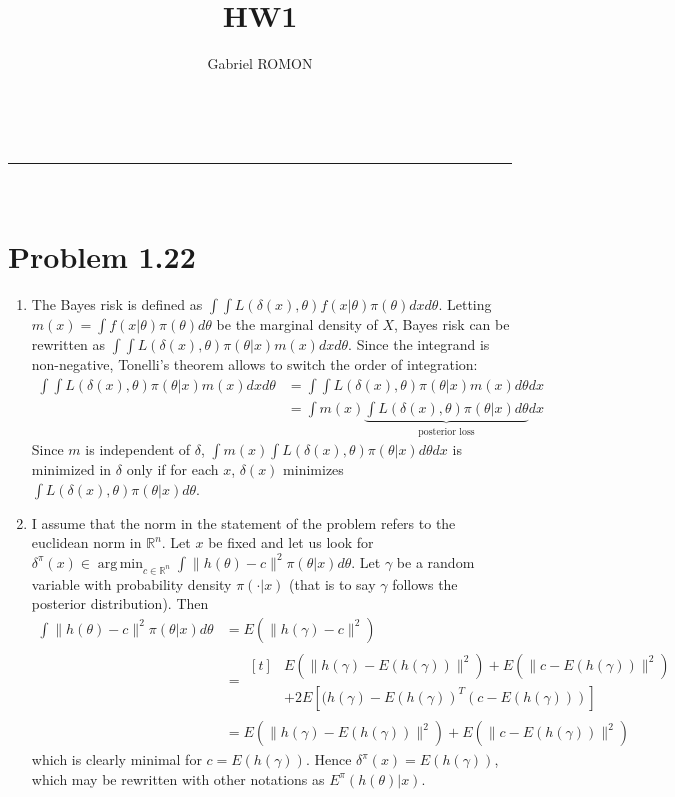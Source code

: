 \documentclass[a4paper,11pt]{article}
\makeatletter
\newcommand{\linia}{\rule{\linewidth}{0.5pt}}
\renewcommand{\maketitle}{
\begin{center}
\vspace{2ex}
{\huge \textsc{\@title}}
\vspace{1ex}
\\
\linia\\
\@author 
\vspace{4ex}
\end{center}
}
\DeclareMathOperator*{\argmin}{arg\,min}
\makeatother
\begin{document}
\title{HW1}

\author{Gabriel ROMON}



\maketitle

\section*{Problem 1.22}

\begin{enumerate}[label=(\alph*)]
  \item The Bayes risk is defined as $\displaystyle \int \int L(\delta(x),\theta)f(x|\theta)\pi(\theta)dx d\theta$. Letting $m(x)=\int f(x|\theta)\pi(\theta)d\theta$ be the marginal density of $X$, Bayes risk can be rewritten as $\displaystyle \int \int L(\delta(x),\theta)\pi(\theta|x)m(x)dx d\theta$. Since the integrand is non-negative, Tonelli's theorem allows to switch the order of integration:
  $$\begin{aligned}\int \int L(\delta(x),\theta)\pi(\theta|x)m(x)dx d\theta &= \int \int L(\delta(x),\theta)\pi(\theta|x)m(x)d\theta dx\\ 
  &= \int m(x) \underbrace{\int L(\delta(x),\theta)\pi(\theta|x) d\theta}_{\text{posterior loss}} dx \end{aligned}$$
  Since $m$ is independent of $\delta$, $\displaystyle\int m(x) \int L(\delta(x),\theta)\pi(\theta|x) d\theta dx$ is minimized in $\delta$ only if for each $x$, $\delta(x)$ minimizes $\displaystyle\int L(\delta(x),\theta)\pi(\theta|x) d\theta$.

  \item I assume that the norm in the statement of the problem refers to the euclidean norm in $\mathbb R^n$. Let $x$ be fixed and let us look for $\displaystyle \delta^{\pi}(x)\in \argmin_{c\in \mathbb R^n} \int \|h(\theta)-c\|^2\pi(\theta|x)d\theta$. Let $\gamma$ be a random variable with probability density $\pi(\cdot|x)$ (that is to say $\gamma$ follows the posterior distribution). Then 
  $$\begin{aligned}
    \int \|h(\theta)-c\|^2\pi(\theta|x)d\theta &= E(\|h(\gamma)-c\|^2)\\
    &= \begin{aligned}[t] &E(\|h(\gamma)-E(h(\gamma))\|^2) + E(\|c-E(h(\gamma))\|^2) \\ &+ 2E[(h(\gamma)-E(h(\gamma))^T(c-E(h(\gamma)))] \end{aligned}\\
    &= E(\|h(\gamma)-E(h(\gamma))\|^2) + E(\|c-E(h(\gamma))\|^2)
  \end{aligned}$$
  which is clearly minimal for $c=E(h(\gamma))$. Hence $\delta^{\pi}(x) = E(h(\gamma))$, which may be rewritten with other notations as $E^{\pi}(h(\theta)|x)$.


\end{enumerate}
\end{document}
